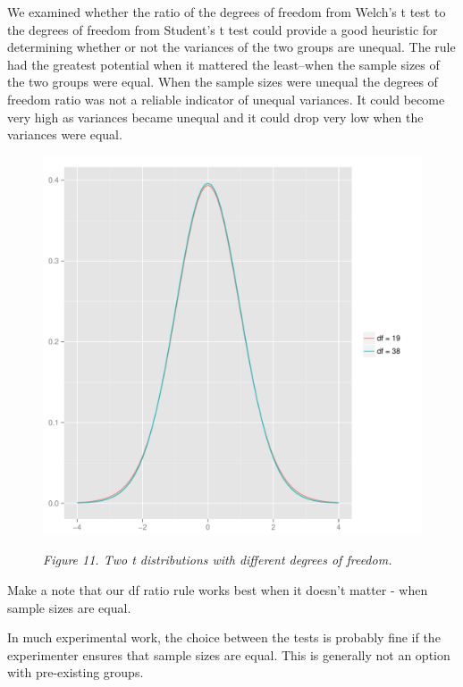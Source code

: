 \documentclass[man,a4paper,noextraspace,apacite]{apa6}\usepackage[]{graphicx}\usepackage[]{color}
\makeatletter
\def\maxwidth{ %
  \ifdim\Gin@nat@width>\linewidth
    \linewidth
  \else
    \Gin@nat@width
  \fi
}
\newenvironment{knitrout}{}{} %
\makeatother
\begin{document}
    We examined whether the ratio of the degrees of freedom from Welch's t test to the degrees of freedom from Student's t test could provide a good heuristic for determining whether or not the variances of the two groups are unequal. The rule had the greatest potential when it mattered the least--when the sample sizes of the two groups were equal. When the sample sizes were unequal the degrees of freedom ratio was not a reliable indicator of unequal variances. It could become very high as variances became unequal and it could drop very low when the variances were equal.

\begin{figure}  
\begin{knitrout}
\color{fgcolor}
\includegraphics[width=\maxwidth]{figure/tdist} 

\end{knitrout}
\textit{Figure 11. Two t distributions with different degrees of freedom.}
\end{figure}

Make a note that our df ratio rule works best when it doesn't matter - when sample sizes are equal.
    
    In much experimental work, the choice between the tests is probably fine if the experimenter ensures that sample sizes are equal. This is generally not an option with pre-existing groups. 
    
\end{document}
